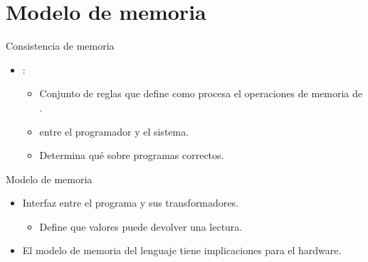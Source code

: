 \section{Modelo de memoria}

\begin{frame}[t]{Consistencia de memoria}
\makebox[\textwidth][c]{}
\begin{itemize}
  \item {}:
    \begin{itemize}
      \item Conjunto de reglas que define como 
            procesa el  
            operaciones de memoria de .
      \item {} entre el programador y el sistema.
      \item Determina qué  sobre programas correctos.
    \end{itemize}
\end{itemize}
\end{frame}

\begin{frame}[t]{Modelo de memoria}
\begin{itemize}
  \item Interfaz entre el programa y sus transformadores.
    \begin{itemize}
      \item Define que valores puede devolver una lectura.
    \end{itemize}
  \item El modelo de memoria del lenguaje tiene implicaciones para el hardware.
\end{itemize}
\makebox[\textwidth][c]{}
\end{frame}

